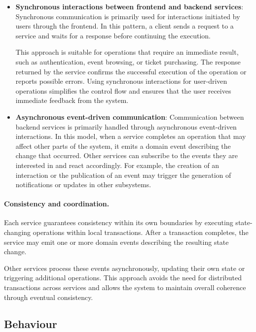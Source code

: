 \begin{itemize}
  \item \textbf{Synchronous interactions between frontend and backend services}:
  Synchronous communication is primarily used for interactions initiated by users through the frontend. In this pattern, a client sends a request to a service and waits for a response before continuing the execution.

  This approach is suitable for operations that require an immediate result, such as authentication, event browsing, or ticket purchasing. The response returned by the service confirms the successful execution of the operation or reports possible errors.
  Using synchronous interactions for user-driven operations simplifies the control flow and ensures that the user receives immediate feedback from the system.

  \item \textbf{Asynchronous event-driven communication}:
  Communication between backend services is primarily handled through asynchronous event-driven interactions. In this model, when a service completes an operation that may affect other parts of the system, it emits a domain event describing the change that occurred.
  Other services can subscribe to the events they are interested in and react accordingly. For example, the creation of an interaction or the publication of an event may trigger the generation of notifications or updates in other subsystems.
\end{itemize}

\paragraph{Consistency and coordination.}

Each service guarantees consistency within its own boundaries by executing state-changing operations within local transactions. After a transaction completes, the service may emit one or more domain events describing the resulting state change.

Other services process these events asynchronously, updating their own state or triggering additional operations. This approach avoids the need for distributed transactions across services and allows the system to maintain overall coherence through eventual consistency.

\subsection{Behaviour}

